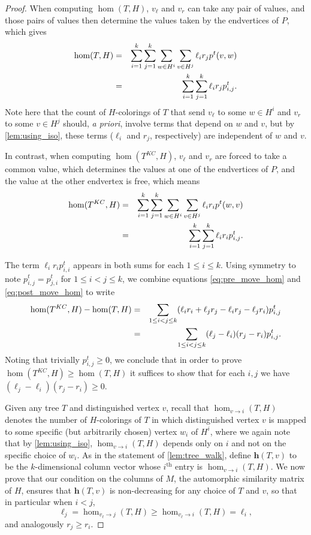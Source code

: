 \documentclass[11pt]{article}
\theoremstyle{definition}
\newcommand{\ith}[1]{$#1^{\text{th}}$}
\newcommand{\homclass}[4]{\hom_{#1\to#2}(#3,#4)}
\begin{document}
\begin{proof}
When computing $\hom(T,H)$, $v_\ell$ and $v_r$ can take any pair of values, and those pairs of values then determine the values taken by the endvertices of $P$, which gives
\begin{eqnarray} 
\hom(T,H) & = & \sum_{i=1}^k \sum_{j=1}^k \sum_{w \in H^i} \sum_{v \in H^j} \ell_ir_j p^t(v,w) \notag \\
& = & \sum_{i=1}^k \sum_{j=1}^k \ell_ir_j p^t_{i,j}. \label{eq:pre_move_hom}
\end{eqnarray}
Note here that the count of $H$-colorings of $T$ that send $v_\ell$ to some $w \in H^i$ and $v_r$ to some $v \in H^j$ should, {\it a priori}, involve terms that depend on $w$ and $v$, but by \cref{lem:using_iso}, these terms ($\ell_i$ and $r_j$, respectively) are independent of $w$ and $v$. 

In contrast, when computing $\hom(T^{KC},H)$, $v_\ell$ and $v_r$ are forced to take a common value, which determines the values at one of the endvertices of $P$, and the value at the other endvertex is free, which means
\begin{eqnarray} 
\hom(T^{KC},H) & = & \sum_{i=1}^k \sum_{j=1}^k \sum_{w \in H^i} \sum_{v \in H^j} \ell_ir_i p^t(w,v) \notag \\
& = & \sum_{i=1}^k \sum_{j=1}^k \ell_ir_i p^t_{i,j}. \label{eq:post_move_hom}
\end{eqnarray}
 
The term $\ell_ir_ip^t_{i,i}$ appears in both sums for each $1 \le i \le k$. Using symmetry to note $p^t_{i,j} = p^t_{j,i}$ for $1 \le i < j \le k$, we combine equations \eqref{eq:pre_move_hom} and \eqref{eq:post_move_hom} to write
\begin{eqnarray}
\hom(T^{KC},H) - \hom(T,H) & = & \sum_{1 \le i < j \le k} (\ell_ir_i+\ell_jr_j-\ell_ir_j-\ell_jr_i)p^t_{i,j} \notag \\
& = & \sum_{1 \le i < j \le k} (\ell_j-\ell_i)(r_j-r_i)p^t_{i,j}. \label{eq:non-negative}
\end{eqnarray}
Noting that trivially $p^t_{i,j}\ge 0$, we conclude that in order to prove $\hom(T^{KC},H) \ge \hom(T,H)$ it suffices to show that for each $i,j$ we have $(\ell_j-\ell_i)(r_j-r_i) \ge 0$.

Given any tree $T$ and distinguished vertex $v$, recall that $\homclass{v}{i}{T}{H}$ denotes the number of $H$-colorings of $T$ in which distinguished vertex $v$ is mapped to some specific (but arbitrarily chosen) vertex $w_i$ of $H^i$, where we again note that by \cref{lem:using_iso}, $\homclass{v}{i}{T}{H}$ depends only on $i$ and not on the specific choice of $w_i$. As in the statement of \cref{lem:tree_walk}, define $\mathbf{h}(T,v)$ to be the $k$-dimensional column vector whose \ith{i} entry is $\homclass{v}{i}{T}{H}$. We now prove that our condition on the columns of $M$, the automorphic similarity matrix of $H$, ensures that $\mathbf{h}(T,v)$ is non-decreasing for any choice of $T$ and $v$, so that in particular when $i < j$,
\[ \ell_j = \homclass{v_\ell}{j}{T}{H} \ge \homclass{v_\ell}{i}{T}{H} = \ell_i,\]
and analogously $r_j \ge r_i$.


\end{proof}
\end{document}
